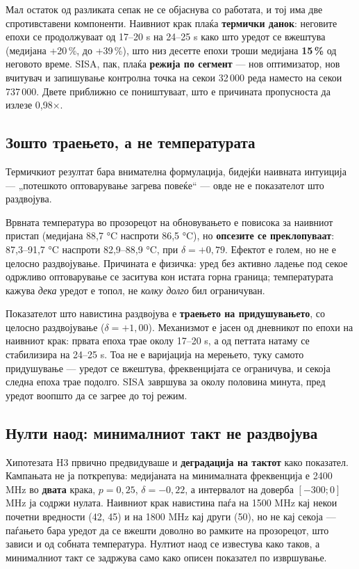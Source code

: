 Мал остаток од разликата сепак не се објаснува со работата, и тој има две спротивставени
компоненти. Наивниот крак плаќа \textbf{термички данок}: неговите епохи се продолжуваат од
17–20 s на 24–25 s како што уредот се вжештува (медијана +20\,\%, до +39\,\%), што низ десетте
епохи троши медијана \textbf{15\,\%} од неговото време. SISA, пак, плаќа \textbf{режија по сегмент} --- нов оптимизатор, нов вчитувач и запишување контролна точка на секои 32\,000 реда наместо на
секои 737\,000. Двете приближно се поништуваат, што е причината пропусноста да излезе 0,98×.

\subsection{Зошто траењето, а не температурата}

Термичкиот резултат бара внимателна формулација, бидејќи наивната интуиција --- „потешкото
оптоварување загрева повеќе“ --- овде не е показателот што раздвојува.

Врвната температура во прозорецот на обновувањето е повисока за наивниот пристап
(медијана 88,7 °C наспроти 86,5 °C), но \textbf{опсезите се преклопуваат}: 87,3–91,7 °C наспроти
82,9–88,9 °C, при $\delta = +0{,}79$. Ефектот е голем, но не е целосно раздвојување. Причината
е физичка: уред без активно ладење под секое одржливо оптоварување се заситува кон истата
горна граница; температурата кажува \emph{дека} уредот е топол, не \emph{колку долго} бил
ограничуван.

Показателот што навистина раздвојува е \textbf{траењето на придушувањето}, со целосно
раздвојување ($\delta = +1{,}00$). Механизмот е јасен од дневникот по епохи на наивниот крак:
првата епоха трае околу 17–20 s, а од петтата натаму се стабилизира на 24–25 s. Тоа не е
варијација на мерењето, туку самото придушување --- уредот се вжештува, фреквенцијата се
ограничува, и секоја следна епоха трае подолго. SISA завршува за околу половина минута,
пред уредот воопшто да се загрее до тој режим.

\subsection{Нулти наод: минималниот такт не раздвојува}

Хипотезата H3 првично предвидуваше и \textbf{деградација на тактот} како показател. Кампањата не
ја поткрепува: медијаната на минималната фреквенција е 2400 MHz во \textbf{двата} крака,
$p = 0{,}25$, $\delta = -0{,}22$, а интервалот на доверба $[-300; 0]$ MHz ја содржи нулата.
Наивниот крак навистина паѓа на 1500 MHz кај некои почетни вредности (42, 45) и на 1800 MHz
кај други (50), но не кај секоја --- паѓањето бара уредот да се вжешти доволно во рамките на
прозорецот, што зависи и од собната температура. Нултиот наод се известува како таков, а
минималниот такт се задржува само како описен показател по извршување.

